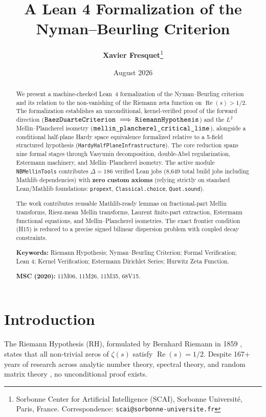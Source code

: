 \documentclass[11pt,a4paper]{article}
\title{\textbf{A Lean 4 Formalization of the Nyman--Beurling Criterion}}
\author{\textbf{Xavier Fresquet}\thanks{Sorbonne Center for Artificial Intelligence (SCAI), Sorbonne Universit\'e, Paris, France. Correspondence: \texttt{scai@sorbonne-universite.fr}}}
\date{August 2026}
\theoremstyle{plain}
\theoremstyle{definition}
\theoremstyle{remark}
\DeclareMathOperator{\RePart}{Re}
\renewcommand{\Re}{\RePart}
\begin{document}
\maketitle

\begin{abstract}
We present a machine-checked Lean~4 formalization of the Nyman--Beurling criterion and its relation to the non-vanishing of the Riemann zeta function on $\Re(s) > 1/2$. The formalization establishes an unconditional, kernel-verified proof of the forward direction ($\text{\texttt{BaezDuarteCriterion}} \implies \text{\texttt{RiemannHypothesis}}$) and the $L^2$ Mellin--Plancherel isometry ($\text{\texttt{mellin\_plancherel\_critical\_line}}$), alongside a conditional half-plane Hardy space equivalence formalized relative to a 5-field structured hypothesis (\texttt{HardyHalfPlaneInfrastructure}). The core reduction spans nine formal stages through Vasyunin decomposition, double-Abel regularization, Estermann machinery, and Mellin--Plancherel isometry. The active module \texttt{NBMellinTools} contributes $\Delta = 186$ verified Lean jobs (8,649 total build jobs including Mathlib dependencies) with \textbf{zero custom axioms} (relying strictly on standard Lean/Mathlib foundations: \texttt{propext}, \texttt{Classical.choice}, \texttt{Quot.sound}). 

The work contributes reusable Mathlib-ready lemmas on fractional-part Mellin transforms, Riesz-mean Mellin transforms, Laurent finite-part extraction, Estermann functional equations, and Mellin--Plancherel isometries. The exact frontier condition (H15) is reduced to a precise signed bilinear dispersion problem with coupled decay constraints.

\textbf{Keywords:} Riemann Hypothesis; Nyman--Beurling Criterion; Formal Verification; Lean 4; Kernel Verification; Estermann Dirichlet Series; Hurwitz Zeta Function.

\textbf{MSC (2020):} 11M06, 11M26, 11M35, 68V15.
\end{abstract}

\section{Introduction}
\label{sec:intro}

The Riemann Hypothesis (RH), formulated by Bernhard Riemann in 1859 \cite{Riemann1859}, states that all non-trivial zeros of $\zeta(s)$ satisfy $\Re(s) = 1/2$. Despite 167+ years of research across analytic number theory, spectral theory, and random matrix theory \cite{IwaniecKowalski2004,MontgomeryVaughan2007,Tenenbaum2015}, no unconditional proof exists.
\end{document}
